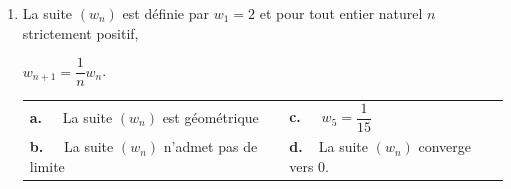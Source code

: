 \documentclass[10pt]{article}
\begin{document}
\begin{enumerate}
\item  La suite $\left(w_n\right)$ est définie par $w_1 = 2$ et pour tout entier naturel $n$ strictement positif, 

$w_{n+1} = \dfrac1n w_n$.
\begin{center}
\begin{tabularx}{\linewidth}{*{2}X}
\textbf{a.~~} La suite $\left(w_n\right)$ est géométrique&\textbf{c.~~} $w_5 = \dfrac{1}{15}$\\
\textbf{b.~~} La suite $\left(w_n\right)$ n'admet pas de limite&\textbf{d.~~}La suite $\left(w_n\right)$ converge vers 0.
\end{tabularx}
\end{center}
\end{enumerate}

\bigskip
\end{document}

